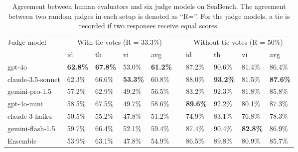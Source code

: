\begin{table*}[!ht]
    \centering
    \small
    \begin{tabular}{llllllllll}
        \toprule
         \multirow{2}{*}{Judge model}& \multicolumn{4}{c}{With tie votes (R = 33.3\%)} & & \multicolumn{4}{c}{Without tie votes (R = 50\%)} \\ 
         \cmidrule{2-5} \cmidrule{7-10}
        & id & th & vi & avg & & id & th & vi & avg \\ 
        \midrule
        gpt-4o & \textbf{62.8\%} & \textbf{67.8\%} & 53.0\% & \textbf{61.2\%} & & 87.2\% & 90.6\% & 81.4\% & 86.4\% \\ 
        claude-3.5-sonnet & 62.3\% & 66.6\% & \textbf{53.3\%} & 60.8\% & & 88.0\% & \textbf{93.2\%} & 81.5\% & \textbf{87.6\%} \\ 
        gemini-pro-1.5 & 57.2\% & 62.9\% & 49.2\% & 56.5\% & & 83.2\% & 92.3\% & 81.8\% & 85.8\% \\ 
        gpt-4o-mini & 58.5\% & 67.5\% & 49.7\% & 58.6\% & & \textbf{89.6\%} & 92.2\% & 80.1\% & 87.3\% \\ 
        claude-3-haiku & 50.5\% & 55.2\% & 47.8\% & 51.2\% & & 74.9\% & 83.1\% & 76.8\% & 78.3\% \\ 
        gemini-flash-1.5 & 59.7\% & 66.4\% & 52.1\% & 59.4\% & & 87.4\% & 90.4\% & \textbf{82.8\%} & 86.9\% \\ 
        \midrule
        Ensemble & 53.9\% & 63.1\% & 47.8\% & 54.9\% &  & 86.5\% & 89.8\% & 80.9\% & 85.7\% \\
        \bottomrule
    \end{tabular}
    \caption{Agreement between human evaluators and six judge models on SeaBench. The agreement between two random judges in each setup is denoted as “R=”. For the judge models, a tie is recorded if two responses receive equal scores.}
    \label{tab:seabench_agreement}
\end{table*}